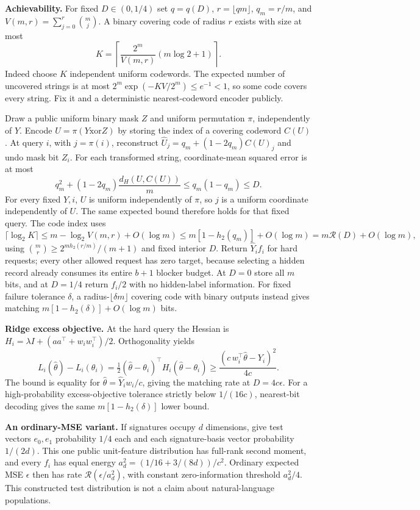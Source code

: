 \documentclass[11pt,a4paper]{article}
\theoremstyle{definition}\newtheorem{definition}[theorem]{Definition}
\begin{document}
\textbf{Achievability.} For fixed $D\in(0,1/4)$ set $q=q(D)$, $r=\lfloor qm\rfloor$, $q_m=r/m$, and $V(m,r)=\sum_{j=0}^r\binom mj$. A binary covering code of radius $r$ exists with size at most
\[
 K=\left\lceil\frac{2^m}{V(m,r)}(m\log 2+1)\right\rceil.
\]
Indeed choose $K$ independent uniform codewords. The expected number of uncovered strings is at most $2^m\exp(-KV/2^m)\le e^{-1}<1$, so some code covers every string. Fix it and a deterministic nearest-codeword encoder publicly.

Draw a public uniform binary mask $Z$ and uniform permutation $\pi$, independently of $Y$. Encode $U=\pi(Y\mathbin{\mathrm{xor}}Z)$ by storing the index of a covering codeword $C(U)$. At query $i$, with $j=\pi(i)$, reconstruct
$\widehat U_j=q_m+(1-2q_m)C(U)_j$ and undo mask bit $Z_i$. For each transformed string, coordinate-mean squared error is at most
\[
 q_m^2+(1-2q_m)\frac{d_H(U,C(U))}{m}
 \le q_m(1-q_m)\le D.
\]
For every fixed $Y,i$, $U$ is uniform independently of $\pi$, so $j$ is a uniform coordinate independently of $U$. The same expected bound therefore holds for that fixed query. The code index uses
\[
 \lceil\log_2 K\rceil
 \le m-\log_2 V(m,r)+O(\log m)
 \le m[1-h_2(q_m)]+O(\log m)
 =m\mathcal R(D)+O(\log m),
\]
using $\binom mr\ge2^{mh_2(r/m)}/(m+1)$ and fixed interior $D$. Return $\widehat Y_i f_i$ for hard requests; every other allowed request has zero target, because selecting a hidden record already consumes its entire $b+1$ blocker budget. At $D=0$ store all $m$ bits, and at $D=1/4$ return $f_i/2$ with no hidden-label information. For fixed failure tolerance $\delta$, a radius-$\lfloor\delta m\rfloor$ covering code with binary outputs instead gives matching $m[1-h_2(\delta)]+O(\log m)$ bits.

\textbf{Ridge excess objective.} At the hard query the Hessian is
$H_i=\lambda I+(aa^\top+w_iw_i^\top)/2$. Orthogonality yields
\[
 L_i(\widehat\theta)-L_i(\theta_i)
 =\tfrac12(\widehat\theta-\theta_i)^\top H_i(\widehat\theta-\theta_i)
 \ge\frac{(c\,w_i^\top\widehat\theta-Y_i)^2}{4c}.
\]
The bound is equality for $\widehat\theta=\widehat Y_iw_i/c$, giving the matching rate at $D=4c\epsilon$. For a high-probability excess-objective tolerance strictly below $1/(16c)$, nearest-bit decoding gives the same $m[1-h_2(\delta)]$ lower bound.

\textbf{An ordinary-MSE variant.} If signatures occupy $d$ dimensions, give test vectors $e_0,e_1$ probability $1/4$ each and each signature-basis vector probability $1/(2d)$. This one public unit-feature distribution has full-rank second moment, and every $f_i$ has equal energy $a_d^2=(1/16+3/(8d))/c^2$. Ordinary expected MSE $\epsilon$ then has rate $\mathcal R(\epsilon/a_d^2)$, with constant zero-information threshold $a_d^2/4$. This constructed test distribution is not a claim about natural-language populations.
\end{document}
